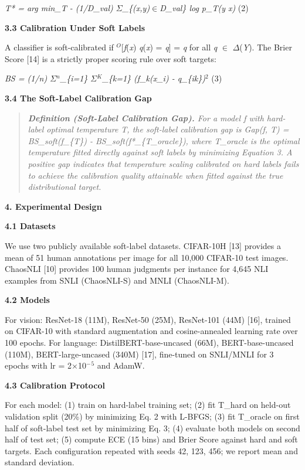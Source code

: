 \documentclass[11pt]{article}
\begin{document}
\emph{T* = arg min\_T - (1/\textbar D\_val\textbar) $\Sigma$\_\{(x,y)$\in$D\_val\}
log p\_T(y \textbar{} x)} (2)

\textbf{3.3 Calibration Under Soft Labels}

A classifier is soft-calibrated if $^O${[}\emph{f}(\emph{x}) \textbar{}
\emph{q}(\emph{x}) = \emph{q}{]} = \emph{q} for all \emph{q} $\in$
$\Delta$(\emph{Y}). The Brier Score {[}14{]} is a strictly proper scoring rule
over soft targets:

\emph{BS = (1/n) $\Sigma$$^n$\_\{i=1\} $\Sigma$$^K$\_\{k=1\} (f\_k(x\_i) - q\_\{ik\})$^2$} (3)

\textbf{3.4 The Soft-Label Calibration Gap}

\begin{quote}
\emph{\textbf{Definition (Soft-Label Calibration Gap).} For a model f
with hard-label optimal temperature T, the soft-label calibration gap is
Gap(f, T) = BS\_soft(f\_\{T\}) - BS\_soft(f*\_\{T\_oracle\}), where
T\_oracle is the optimal temperature fitted directly against soft labels
by minimizing Equation 3. A positive gap indicates that temperature
scaling calibrated on hard labels fails to achieve the calibration
quality attainable when fitted against the true distributional target.}
\end{quote}

\textbf{4. Experimental Design}

\textbf{4.1 Datasets}

We use two publicly available soft-label datasets. CIFAR-10H {[}13{]}
provides a mean of 51 human annotations per image for all 10,000
CIFAR-10 test images. ChaosNLI {[}10{]} provides 100 human judgments per
instance for 4,645 NLI examples from SNLI (ChaosNLI-S) and MNLI
(ChaosNLI-M).

\textbf{4.2 Models}

For vision: ResNet-18 (11M), ResNet-50 (25M), ResNet-101 (44M) {[}16{]},
trained on CIFAR-10 with standard augmentation and cosine-annealed
learning rate over 100 epochs. For language: DistilBERT-base-uncased
(66M), BERT-base-uncased (110M), BERT-large-uncased (340M) {[}17{]},
fine-tuned on SNLI/MNLI for 3 epochs with lr = 2$\times$10$^{-}$$^5$ and AdamW.

\textbf{4.3 Calibration Protocol}

For each model: (1) train on hard-label training set; (2) fit T\_hard on
held-out validation split (20\%) by minimizing Eq. 2 with L-BFGS; (3)
fit T\_oracle on first half of soft-label test set by minimizing Eq. 3;
(4) evaluate both models on second half of test set; (5) compute ECE (15
bins) and Brier Score against hard and soft targets. Each configuration
repeated with seeds 42, 123, 456; we report mean and standard deviation.
\end{document}
